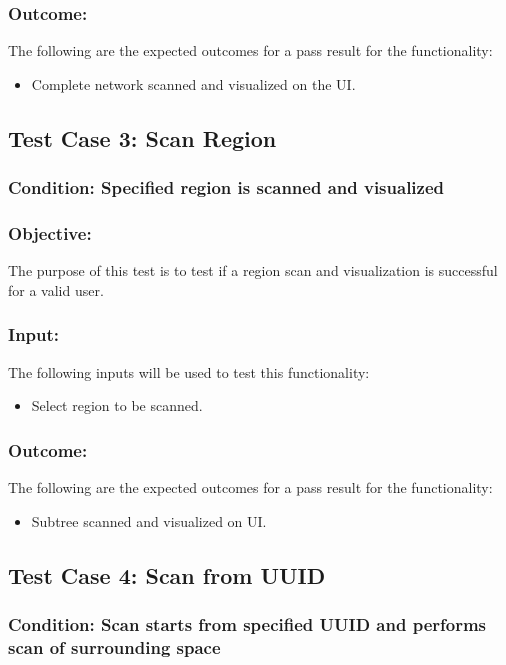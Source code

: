 \documentclass[hidelinks,a4paper,12pt]{article}
\begin{document}
\subsubsection{Outcome: }
The following are the expected outcomes for a pass result for the functionality:
\begin{itemize}
\item Complete network scanned and visualized on the UI.

\end{itemize}

\subsection{Test Case 3: Scan Region }
\subsubsection{Condition: Specified region  is scanned and visualized}
\subsubsection{Objective:} The purpose of this test is to test if a region scan and visualization is successful for a valid user.

\subsubsection{Input:}
 The following inputs will be used to test this functionality:
\begin{itemize}
  \item Select region to be scanned.
\end{itemize}
\subsubsection{Outcome: }
The following are the expected outcomes for a pass result for the functionality:
\begin{itemize}
\item Subtree scanned and visualized on UI.
\end{itemize}


\subsection{Test Case 4: Scan from UUID}
\subsubsection{Condition: Scan starts from specified UUID and performs scan of surrounding space}
\end{document}
